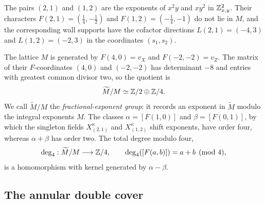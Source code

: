 The pairs $(2,1)$ and $(1,2)$ are the exponents of $x^2y$ and $xy^2$ in
$\mathbb Z^2_{x,y}$.  Their characters $F(2,1)=(\frac14,-\frac12)$ and
$F(1,2)=(-\frac14,-1)$ do not lie in $M$, and the corresponding wall supports
have the cofactor directions $L(2,1)=(-4,3)$ and $L(1,2)=(-2,3)$ in the
coordinates $(s_1,s_2)$.

The lattice $M$ is generated by $F(4,0)=v_X$ and $F(-2,-2)=v_Z$.  The
matrix of their $F$-coordinates $(4,0)$ and $(-2,-2)$ has determinant $-8$
and entries with greatest common divisor two, so the quotient is
\begin{equation}\label{eq:sector-group}
 \widetilde M/M\simeq\mathbb Z/2\oplus\mathbb Z/4.
\end{equation}
We call $\widetilde M/M$ the \emph{fractional-exponent group}: it records an exponent in
$\widetilde M$ modulo the integral exponents $M$.  The classes
$\alpha=[F(1,0)]$ and $\beta=[F(0,1)]$, by which the singleton fields
$X^\kappa_{(2,1)}$ and $X^\kappa_{(1,2)}$ shift exponents, have order four,
whereas $\alpha+\beta$ has order two.  The total degree modulo four,
\begin{equation}\label{eq:diagonal-charge}
 \deg_4:\widetilde M/M\longrightarrow\mathbb Z/4,
 \qquad \deg_4([F(a,b)])=a+b\pmod4,
\end{equation}
is a homomorphism with kernel generated by $\alpha-\beta$.

\subsection{The annular double cover}
\label{subsec:parity-cover}

